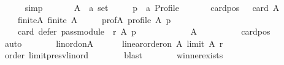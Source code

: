 \begin{isabellebody}
\ \ \ \ \isamarkupfalse%
\ simp\isanewline
{}\isamarkupfalse%
\isanewline
\ \ \isamarkupfalse%
\isanewline
\ \ \ \ A\ {\isacharcolon}{\kern0pt}{\isacharcolon}{\kern0pt}\ {\isachardoublequoteopen}{\isacharprime}{\kern0pt}a\ set{\isachardoublequoteclose}\ \isanewline
\ \ \ \ p\ {\isacharcolon}{\kern0pt}{\isacharcolon}{\kern0pt}\ {\isachardoublequoteopen}{\isacharprime}{\kern0pt}a\ Profile{\isachardoublequoteclose}\isanewline
\ \ \isamarkupfalse%
\isanewline
\ \ \ \ card{\isacharunderscore}{\kern0pt}pos{\isacharcolon}{\kern0pt}\ {\isachardoublequoteopen}{}\ {\isasymle}\ card\ A{\isachardoublequoteclose}\ \isanewline
\ \ \ \ finite{\isacharunderscore}{\kern0pt}A{\isacharcolon}{\kern0pt}\ {\isachardoublequoteopen}finite\ A{\isachardoublequoteclose}\ \isanewline
\ \ \ \ prof{\isacharunderscore}{\kern0pt}A{\isacharcolon}{\kern0pt}\ {\isachardoublequoteopen}profile\ A\ p{\isachardoublequoteclose}\isanewline
\ \ \isamarkupfalse%
\isanewline
\ \ \ \ {\isachardoublequoteopen}card\ {\isacharparenleft}{\kern0pt}defer\ {\isacharparenleft}{\kern0pt}pass{\isacharunderscore}{\kern0pt}module\ {}\ r{\isacharparenright}{\kern0pt}\ A\ p{\isacharparenright}{\kern0pt}\ {\isacharequal}{\kern0pt}\ {}{\isachardoublequoteclose}\isanewline
\ \ \isamarkupfalse%
\ {\isacharminus}{\kern0pt}\isanewline
\ \ \ \ \isamarkupfalse%
\ {\isachardoublequoteopen}A\ {\isasymnoteq}\ {\isacharbraceleft}{\kern0pt}{\isacharbraceright}{\kern0pt}{\isachardoublequoteclose}\isanewline
\ \ \ \ \ \ \isamarkupfalse%
\ card{\isacharunderscore}{\kern0pt}pos\isanewline
\ \ \ \ \ \ \isamarkupfalse%
\ auto\isanewline
\ \ \ \ \isamarkupfalse%
\ \isamarkupfalse%
\ lin{\isacharunderscore}{\kern0pt}ord{\isacharunderscore}{\kern0pt}on{\isacharunderscore}{\kern0pt}A{\isacharcolon}{\kern0pt}\isanewline
\ \ \ \ \ \ {\isachardoublequoteopen}linear{\isacharunderscore}{\kern0pt}order{\isacharunderscore}{\kern0pt}on\ A\ {\isacharparenleft}{\kern0pt}limit\ A\ r{\isacharparenright}{\kern0pt}{\isachardoublequoteclose}\isanewline
\ \ \ \ \ \ \isamarkupfalse%
\ order\ limit{\isacharunderscore}{\kern0pt}presv{\isacharunderscore}{\kern0pt}lin{\isacharunderscore}{\kern0pt}ord\isanewline
\ \ \ \ \ \ \isamarkupfalse%
\ blast\isanewline
\ \ \ \ \isamarkupfalse%
\ \isamarkupfalse%
\ winner{\isacharunderscore}{\kern0pt}exists{\isacharcolon}{\kern0pt}\isanewline

\end{isabellebody}
